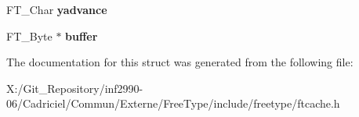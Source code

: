 \begin{DoxyCompactItemize}
\item 
\hypertarget{struct_f_t_c___s_bit_rec___aabe767ddaf7ff62918886c6f62e9ac28}{F\-T\-\_\-\-Char {\bfseries yadvance}}\label{struct_f_t_c___s_bit_rec___aabe767ddaf7ff62918886c6f62e9ac28}

\item 
\hypertarget{struct_f_t_c___s_bit_rec___abe4d78fc3f411d67e7fc43f7aa21bd1d}{F\-T\-\_\-\-Byte $\ast$ {\bfseries buffer}}\label{struct_f_t_c___s_bit_rec___abe4d78fc3f411d67e7fc43f7aa21bd1d}

\end{DoxyCompactItemize}


The documentation for this struct was generated from the following file\-:\begin{DoxyCompactItemize}
\item 
X\-:/\-Git\-\_\-\-Repository/inf2990-\/06/\-Cadriciel/\-Commun/\-Externe/\-Free\-Type/include/freetype/ftcache.\-h\end{DoxyCompactItemize}
